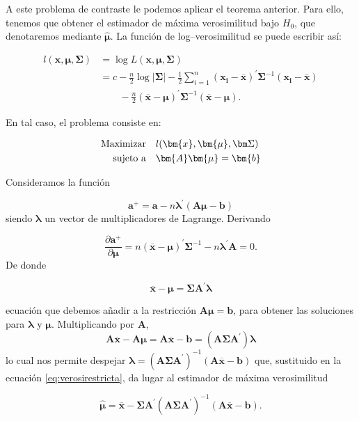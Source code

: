 \documentclass[
  a4paper,
  oneside]{scrbook}
\theoremstyle{definition}
\theoremstyle{definition}
\theoremstyle{definition}
\theoremstyle{definition}
\theoremstyle{remark}
\begin{document}
A este problema de contraste le podemos aplicar el teorema anterior.
Para ello, tenemos que obtener el estimador de máxima verosimilitud bajo
\(H_0\), que denotaremos mediante \(\hat{\bm{\mu}}\). La función de log--verosimilitud se puede escribir así:

\[\begin{aligned}
l(\bm{x},\bm{\mu},\bm\Sigma)&=\log L(\bm{x},\bm{\mu},\bm\Sigma)\\
&= c-\frac{n}{2} \log |\bm\Sigma|
-\frac{1}{2} \sum_{i=1}^n \left(\bm{x_i}-\overline{\bm{x}}\right)^\prime{}\bm\Sigma^{-1}\left(\bm{x_i}-\overline{\bm{x}}\right)\\
&\qquad -\frac{n}{2} \left(\overline{\bm{x}}-\bm{\mu}\right)^\prime{}\bm\Sigma^{-1}\left(\overline{\bm{x}}-\bm{\mu}\right).
\end{aligned}\]

En tal caso, el problema consiste en:

\[
\begin{aligned}
  \textnormal{Maximizar  }&\ \ l(\bm{x}, \bm{\mu},\bm\Sigma)\\
  \textnormal{sujeto a  }&\ \ \bm{A}\bm{\mu}=\bm{b}
\end{aligned}
\]

Consideramos la función

\[\bm{a}^+=\bm{a}-n\bm{\lambda}^\prime{}(\bm{A}\bm{\mu}-\bm{b})\] siendo
\(\bm{\lambda}\) un vector de multiplicadores de Lagrange. Derivando

\[\frac{\partial \bm{a}^+}{\partial \bm{\mu}}=n\left(\overline{\bm{x}}-\bm{\mu}\right)^\prime{}\bm\Sigma^{-1}-n\bm{\lambda}^\prime{}\bm{A}=0.\]
De donde

\begin{equation}
\overline{\bm{x}}-\bm{\mu}=\bm\Sigma \bm{A}^\prime{} \bm{\lambda}
\label{eq:verosirestricta}
\end{equation}

ecuación que debemos añadir a la restricción \(\bm{A}\bm{\mu}=\bm{b}\),
para obtener las soluciones para \(\bm{\lambda}\) y \(\bm{\mu}\).
Multiplicando por \(\bm{A}\),
\[\bm{A}\overline{\bm{x}}-\bm{A}\bm{\mu}=\bm{A}\overline{\bm{x}}-\bm{b}=\left(\bm{A}\bm\Sigma \bm{A}^\prime{}\right)\bm{\lambda}\]
lo cual nos permite despejar
\(\bm{\lambda}=\left(\bm{A}\bm\Sigma \bm{A}^\prime{}\right)^{-1}\left(\bm{A}\overline{\bm{x}}-\bm{b}\right)\)
que, sustituido en la ecuación \eqref{eq:verosirestricta}, da lugar al estimador de máxima
verosimilitud

\[\hat{\bm{\mu}}=\overline{\bm{x}}-\bm\Sigma \bm{A}^\prime{} \left(\bm{A}\bm\Sigma \bm{A}^\prime{}\right)^{-1}\left(\bm{A}\overline{\bm{x}}-\bm{b}\right).\]
\end{document}
